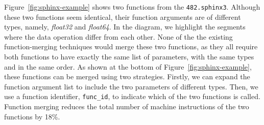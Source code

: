 Figure~\ref{fig:sphinx-example} shows two functions from the \texttt{482.sphinx3}. Although these two functions seem identical, their
function arguments are of different types, namely, \textit{float32} and \textit{float64}. In the diagram, we highlight the segments where
the data operation differ from each other. None of the the existing function-merging techniques would merge these two functions, as they
all require both functions to have exactly the same list of parameters, with the same types and in the same order. As shown at the bottom
of Figure~\ref{fig:sphinx-example}, these functions can be merged using two strategies. Firstly, we can expand the function argument list
to include the two parameters of different types. Then, we use a function identifier, \texttt{func\_id}, to indicate which of the two
functions is called. Function merging reduces the total number of machine instructions of the two functions by 18\%.



